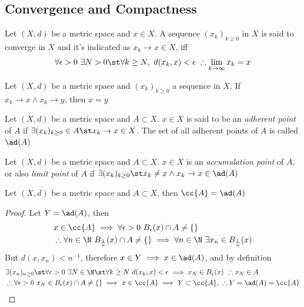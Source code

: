 \documentclass[../mmf.tex]{subfiles}
\begin{document}
\subsection{Convergence and Compactness}
\begin{dfn}[Convergence]
	Let $(X,d)$ be a metric space and $x\in X$. A sequence $(x_k)_{k\ge0}$ in $X$ is said to converge in $X$ and it's indicated as $x_k\to x\in X$, iff
	\begin{equation*}
		\forall\epsilon>0\ \exists N>0\st\forall k\ge N,\ d(x_k,x)<\epsilon\ \therefore\lim_{k\to\infty}x_k=x
	\end{equation*}
\end{dfn}
\begin{thm}
	Let $(X,d)$ be a metric space and $(x_k)_{k\ge0}$ a sequence in $X$. If $x_k\to x\wedge x_k\to y$, then $x=y$
\end{thm}
\begin{dfn}
	Let $(X,d)$ be a metric space and $A\subset X$. $x\in X$ is said to be an \textit{adherent point} of $A$ if $\exists(x_k)_{k\ge0}\in A\st x_k\to x\in X$. The set of all adherent points of $A$ is called $\ad(A)$
\end{dfn}
\begin{dfn}
	Let $(X,d)$ be a metric space and $A\subset X$. $x\in X$ is an \textit{accumulation point} of $A$, or also \textit{limit point} of $A$ if $\exists(x_k)_{k\ge0}\st x_k\ne x\wedge x_k\to x\in\ad(A)$
\end{dfn}
\begin{prop}
	Let $(X,d)$ be a metric space and $A\subset X$, then $\cc{A}=\ad(A)$
\end{prop}
\begin{proof}
	Let $Y=\ad(A)$, then
	\begin{equation*}
		\begin{aligned}
			&x\in\cc{A}\implies{}\forall\epsilon>0\ B_\epsilon(x)\cap A\ne\{\}\\
			&\therefore\forall n\in\N\ B_{\frac{1}{n}}(x)\cap A\ne\{\}\implies{}\forall n\in\N\ \exists x_n\in B_{\frac{1}{n}}(x)
		\end{aligned}
	\end{equation*}
	But $d(x,x_n)<n^{-1}$, therefore $x\in Y\implies{} x\in\ad(A)$, and by definition
	\begin{equation*}
		\begin{aligned}
			&\exists(x_n)_{n\ge0}\st\forall\epsilon>0\ \exists N\in\N\st\forall k\ge N\ d(x_k,x)<\epsilon\implies{} x_N\in B_\epsilon(x)\ \therefore x_N\in A\\
			&\therefore\forall\epsilon>0\ x_N\in B_\epsilon(x)\cap A\ne\{\}\implies{} x\in\cc{A}\implies{} Y\subset\cc{A},\ \therefore Y=\ad(A)=\cc{A}
		\end{aligned}
	\end{equation*}
\end{proof}
\end{document}
